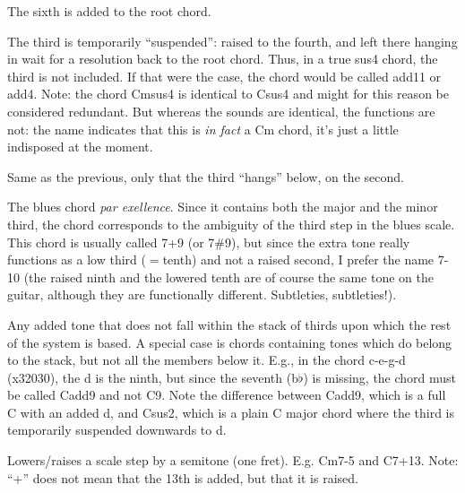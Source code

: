 {\par
{\raggedright \small The sixth is added to the root chord.}

\par
{\raggedright \small The third is temporarily ``suspended'': raised to the fourth,
and left there hanging in wait for a resolution back to the root chord. Thus,
in a true sus4 chord, the third is not included. If that were the case,
the chord would be called add11 or add4. Note: the chord Cmsus4 is identical to Csus4 and might for this reason be considered redundant. But whereas the sounds are identical, the functions are not: the name indicates that this is \emph{in fact} a Cm chord, it's just a little indisposed at the moment.}

\par
{\raggedright \small Same as the previous, only that the third ``hangs'' below, on
the second.}

\par
{\raggedright \small The blues chord \emph{par exellence}. Since it contains both
the major and the minor third, the chord corresponds to the ambiguity
of the third step in the blues scale.  This chord is usually called
7+9 (or 7\#9), but since the extra tone really functions as a low third
($=$tenth) and not a raised second, I prefer the name 7-10 (the raised
ninth and the lowered tenth are of course the same tone on the guitar,
although they are functionally different. Subtleties, subtleties!).}

\pagebreak[3]

\nopagebreak[4]\par\vspace{1em}
{\raggedright \small Any added tone that does not fall within the stack of
thirds upon which the rest of the system is based. A special case is chords containing tones which do belong to the stack, but not all the members below it. E.g., in the chord c-e-g-d (x32030), the d is the ninth, but since the seventh (b$\flat$) is missing, the chord must be called Cadd9 and not C9.
Note the difference between Cadd9, which is a full C with an added d, and Csus2, which is a plain C major chord where the third is temporarily suspended downwards to d.}

\par\vspace{1em}
{\raggedright \small Lowers/raises a scale step by a semitone (one
fret). E.g. Cm7-5 and C7+13. Note: ``+'' does not mean that the 13th
is added, but that it is raised.}

}

